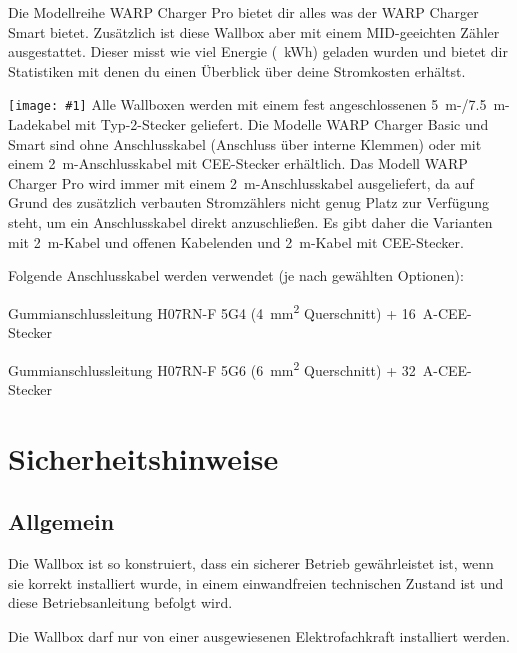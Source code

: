 \documentclass[a4paper,10pt]{article}
\newcommand{\hint}[1]{\begin{tcolorbox}[colback=boxgray,colframe=black,coltext=
white,title=Hinweis]#1\end{tcolorbox}}
\newcommand{\gfx}[1]{\texttt{[image: \#1]}}
\begin{document}
\begin{multicols*}{2}
	Die Modellreihe WARP Charger Pro bietet dir alles was der WARP Charger Smart
	bietet. Zusätzlich ist diese Wallbox aber mit einem MID-geeichten Zähler
	ausgestattet. Dieser misst wie viel Energie (\SI{}{\kWh}) geladen
	wurden und bietet dir Statistiken mit denen du einen Überblick über deine
	Stromkosten erhältst.

	\gfx{./img/resized/type_2_connector_ready}
	Alle Wallboxen werden mit einem fest angeschlossenen
	\SI{5}{\meter}-/\SI{7,5}{\meter}-Ladekabel mit Typ-2-Stecker geliefert. Die Modelle WARP
	Charger Basic und Smart sind ohne Anschlusskabel (Anschluss über interne
	Klemmen) oder mit einem \SI{2}{\meter}-Anschlusskabel mit CEE-Stecker
	erhältlich. Das Modell WARP Charger Pro wird immer mit einem
	\SI{2}{\meter}-Anschlusskabel ausgeliefert, da auf Grund des zusätzlich
	verbauten Stromzählers nicht genug Platz zur Verfügung steht, um ein
	Anschlusskabel direkt anzuschließen. Es gibt daher die Varianten mit
	\SI{2}{\meter}-Kabel und offenen Kabelenden und
	\SI{2}{\meter}-Kabel mit CEE-Stecker.

	Folgende Anschlusskabel werden verwendet (je nach gewählten Optionen):

	\begin{description}[leftmargin=!,labelwidth=\widthof{\textbf{\SI{22}{\kilo\watt}}}]
		\item[\SI{11}{\kilo\watt}]Gummianschlussleitung H07RN-F 5G4
		      (\SI{4}{\square\milli\meter}
		      Querschnitt) + \SI{16}{\ampere}-CEE-Stecker
		\item[\SI{22}{\kilo\watt}]Gummianschlussleitung H07RN-F 5G6
		      (\SI{6}{\square\milli\meter}
		      Querschnitt) + \SI{32}{\ampere}-CEE-Stecker
	\end{description}

	\section{Sicherheitshinweise}
	\subsection{Allgemein}
	Die Wallbox ist so konstruiert, dass ein sicherer Betrieb gewährleistet ist,
	wenn sie korrekt installiert wurde, in einem einwandfreien technischen Zustand
	ist und diese Betriebsanleitung befolgt wird. \hint{Die Wallbox darf nur von einer ausgewiesenen Elektrofachkraft installiert
		werden.}


\end{multicols*}
\end{document}
